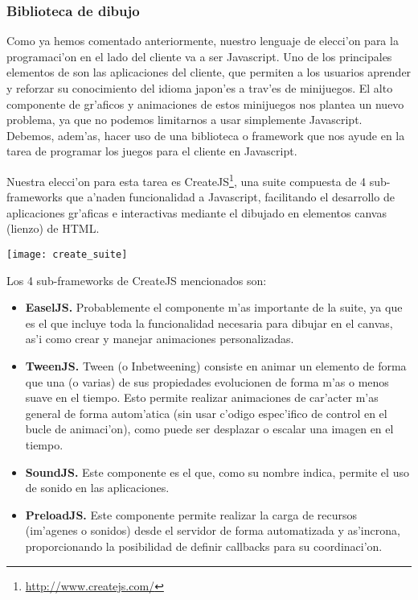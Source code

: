 \subsubsection{Biblioteca de dibujo}
\label{sub:biblioteca_de_dibujo}

Como ya hemos comentado anteriormente, nuestro lenguaje de elecci'on para la programaci'on en el
lado del cliente va a ser Javascript. 
Uno de los principales elementos de \Nipponline{} son las aplicaciones del cliente, que permiten a
los usuarios aprender y reforzar su conocimiento del idioma japon'es a trav'es de minijuegos. El
alto componente de gr'aficos y animaciones de estos minijuegos nos plantea un nuevo problema, ya
que no podemos limitarnos a usar simplemente Javascript. Debemos, adem'as, hacer uso de una
biblioteca o framework que nos ayude en la tarea de programar los juegos para el cliente en
Javascript.

Nuestra elecci'on para esta tarea es CreateJS\footnote{\url{http://www.createjs.com/}}, una suite compuesta de 4 
sub-frameworks que a'naden funcionalidad a Javascript, facilitando el desarrollo de aplicaciones
gr'aficas e interactivas mediante el dibujado en elementos canvas (lienzo) de HTML.

\begin{center}
\texttt{[image: create\_suite]}
\end{center}

Los 4 sub-frameworks de CreateJS mencionados son:

\begin{itemize}
\item \textbf{EaselJS.} Probablemente el componente m'as importante de la suite, ya que es el que incluye
toda la funcionalidad necesaria para dibujar en el canvas, as'i como crear y manejar animaciones
personalizadas.
\item \textbf{TweenJS.} Tween (o Inbetweening) consiste en animar un elemento de forma que una (o varias)
de sus propiedades evolucionen de forma m'as o menos suave en el tiempo. Esto permite realizar
animaciones de car'acter m'as general de forma autom'atica (sin usar c'odigo espec'ifico de 
control en el bucle de animaci'on), como puede ser desplazar o escalar una imagen en el tiempo.
\item \textbf{SoundJS.} Este componente es el que, como su nombre indica, permite el uso de sonido en las
aplicaciones.
\item \textbf{PreloadJS.} Este componente permite realizar la carga de recursos (im'agenes o sonidos) desde
el servidor de forma automatizada y as'incrona, proporcionando la posibilidad de definir callbacks
para su coordinaci'on.
\end{itemize}

